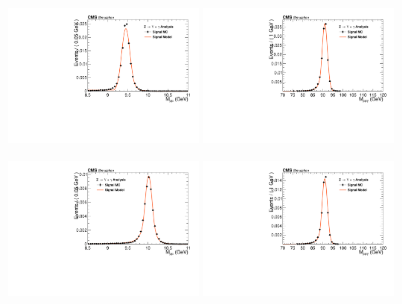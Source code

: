 \begin{figure}[!htbp]
\begin{center}


\includegraphics[width=0.45\textwidth]{figures_and_tables/fitPlotFiles2D/ZToUpsilonPhotonSignalAndBackgroundFit/mMuMNU_ZToUpsilon1SPhotonSignalAndBackgroundFit_Signal_Cat2}\hspace*{1.cm}
\includegraphics[width=0.45\textwidth]{figures_and_tables/fitPlotFiles2D/ZToUpsilonPhotonSignalAndBackgroundFit/mHZ_ZToUpsilon1SPhotonSignalAndBackgroundFit_Signal_Cat2_default}\hspace*{1.cm}

\includegraphics[width=0.45\textwidth]{figures_and_tables/fitPlotFiles2D/ZToUpsilonPhotonSignalAndBackgroundFit/mMuMNU_ZToUpsilon2SPhotonSignalAndBackgroundFit_Signal_Cat2}\hspace*{1.cm}
\includegraphics[width=0.45\textwidth]{figures_and_tables/fitPlotFiles2D/ZToUpsilonPhotonSignalAndBackgroundFit/mHZ_ZToUpsilon2SPhotonSignalAndBackgroundFit_Signal_Cat2_default}\hspace*{1.cm}


\end{center}
\end{figure}
